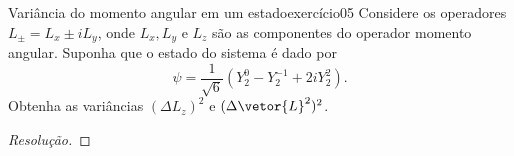 \begin{exercício}{Variância do momento angular em um estado}{exercício05}
    Considere os operadores \(L_\pm = L_x \pm i L_y\), onde \(L_x, L_y\) e \(L_z\) são as componentes do operador momento angular. Suponha que o estado do sistema é dado por
    \begin{equation*}
        \psi = \frac1{\sqrt{6}}\left(Y_2^0 - Y_2^{-1} + 2i Y_2^2\right).
    \end{equation*}
    Obtenha as variâncias \((\Delta L_z)^2\) e \((\Delta \vetor{L}^2)^2\).
\end{exercício}
\begin{proof}[Resolução]

\end{proof}
